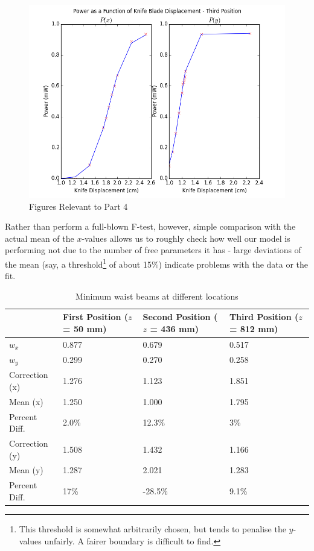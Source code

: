 \documentclass[10pt,a4paper]{article}
\begin{document}
\begin{figure}[H]
\includegraphics[scale = 0.5]{../Analysis/figure_3.png}
\caption{Figures Relevant to Part 4} 
\end{figure}
\noindent Rather than perform a full-blown F-test, however, simple comparison with the actual mean of the $x$-values allows us to roughly check how well our model is performing not due to the number of free parameters it has - large deviations of the mean (say, a threshold\footnote{This threshold is somewhat arbitrarily chosen, but tends to penalise the $y$-values unfairly. A fairer boundary is difficult to find.} of about 15\%) indicate problems with the data or the fit. 
\begin{table}
\centering
\begin{tabular}{|p{3cm}|p{3cm}|p{3cm}|p{3cm}|} 
\hline 
 & First Position ($z$ = 50 mm) & Second Position ($z$ = 436 mm) & Third Position ($z$ = 812 mm) \\ 
\hline 
$w_{x}$ & 0.877 & 0.679 & 0.517 \\ 
\hline 
$w_{y}$ & 0.299 & 0.270 & 0.258 \\ 
\hline 
Correction (x) & 1.276 & 1.123 & 1.851 \\ 
\hline 
Mean (x) & 1.250 & 1.000 & 1.795 \\ 
\hline 
Percent Diff. & 2.0\% & 12.3\% & 3\% \\ 
\hline 
Correction (y) & 1.508 & 1.432 & 1.166 \\ 
\hline 
Mean (y) & 1.287 & 2.021 & 1.283 \\ 
\hline 
Percent Diff. & 17\% & -28.5\% & 9.1\% \\ 
\hline
\end{tabular}
\caption{Minimum waist beams at different locations} 
\end{table}
\end{document}
